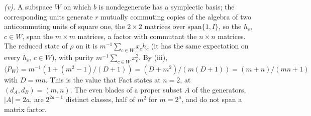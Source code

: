 \emph{(v).} A subspace $W$ on which $b$ is nondegenerate has a symplectic basis; the corresponding units generate $r$ mutually commuting copies of the algebra of two anticommuting units of square one, the $2\times2$ matrices over $\mathrm{span}\{1, I\}$, so the $h_{c}$, $c \in W$, span the $m\times m$ matrices, a factor with commutant the $n\times n$ matrices. The reduced state of $\rho$ on it is $m^{-1}\sum_{c\in W}x_{c}h_{c}$ (it has the same expectation on every $h_{c}$, $c \in W$), with purity $m^{-1}\sum_{c\in W}x_{c}^{2}$. By (iii), $\langle P_{W}\rangle = m^{-1}(1 + (m^{2} - 1)/(D + 1)) = (D + m^{2})/(m(D + 1)) = (m + n)/(mn + 1)$ with $D = mn$. This is the value that Fact  states at $n = 2$, at $(d_{A}, d_{B}) = (m, n)$. The even blades of a proper subset $A$ of the generators, $|A| = 2a$, are $2^{2a-1}$ distinct classes, half of $m^{2}$ for $m = 2^{a}$, and do not span a matrix factor.
